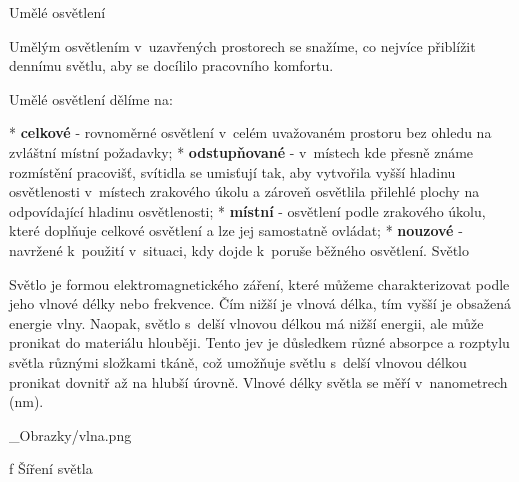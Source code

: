 \chap Umělé osvětlení

Umělým osvětlením v~uzavřených prostorech se snažíme, co nejvíce přiblížit dennímu světlu, aby se docílilo pracovního komfortu.

Umělé osvětlení dělíme na:

\begitems
* {\bf celkové} - rovnoměrné osvětlení v~celém uvažovaném prostoru bez ohledu na zvláštní místní požadavky;
* {\bf odstupňované} - v~místech kde přesně známe rozmístění pracovišť, svítidla se umisťují tak, aby vytvořila
    vyšší hladinu osvětlenosti v~místech zrakového úkolu a zároveň osvětlila přilehlé plochy na odpovídající hladinu osvětlenosti;
* {\bf místní} - osvětlení podle zrakového úkolu, které doplňuje celkové osvětlení a lze jej samostatně ovládat;
* {\bf nouzové}  - navržené k~použití v~situaci, kdy dojde k~poruše běžného osvětlení.
\enditems
\sec Světlo


Světlo je formou elektromagnetického záření, které můžeme charakterizovat podle jeho vlnové délky nebo frekvence.
Čím nižší je vlnová délka, tím vyšší je obsažená energie vlny. Naopak, světlo s~delší vlnovou délkou má nižší energii,
ale může pronikat do materiálu hlouběji. Tento jev je důsledkem různé absorpce a rozptylu světla různými složkami
tkáně, což umožňuje světlu s~delší vlnovou délkou pronikat dovnitř až na hlubší úrovně.
Vlnové délky světla se měří v~nanometrech (nm).

{}
\picw=10cm _Obrazky/vlna.png
\caption/f Šíření světla



